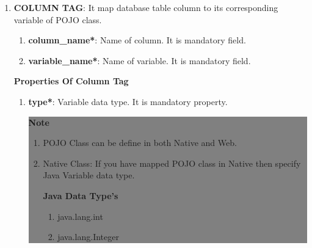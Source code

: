 \begin{enumerate}
\begin{enumerate}
\begin{center}
	\end{center}
			
		\end{enumerate}


	\item \small \textbf{COLUMN TAG}: It map database table column to its corresponding variable of POJO class.

		\begin{enumerate}

			\item \small \textbf{column\_name*}: Name of column. It is mandatory field.
			\item \small \textbf{variable\_name*}: Name of variable. It is mandatory field.

		\end{enumerate}

		
		\par
		\textbf{Properties Of Column Tag}
	
		\begin{enumerate}

			\item \small \textbf{type*}: Variable data type. It is mandatory property. 


	\begin{center}
		\colorbox{grey}{
			\parbox[t]{.8\linewidth}{
				\fontsize{11pt}{11pt}\selectfont %
				\vspace*{0.1cm} %
		
				\hfill \textbf{Note} \\

				\hfill 

				\begin{enumerate}
		
					\item \small POJO Class can be define in both Native and Web.

					\item \small Native Class: If you have mapped POJO class in Native then specify Java Variable data type.

					\textbf{Java Data Type's}
					\begin{enumerate}

						\item \small java.lang.int

						\item \small java.lang.Integer


\end{enumerate}
\end{enumerate}}}
\end{center}
\end{enumerate}
\end{enumerate}
